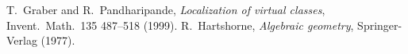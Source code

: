 \documentclass[12pt]{amsart}
\theoremstyle{definition}
\theoremstyle{property}
\renewcommand\_{^{}_}
\begin{document}
\begin{thebibliography}{MNOP2}
 T.~Graber and R.~Pandharipande, \textit{Localization of virtual classes}, Invent.~Math.~135 487--518 (1999). %
 R.~Hartshorne, \textit{Algebraic geometry}, Springer-Verlag (1977).

\end{thebibliography}
\end{document}
